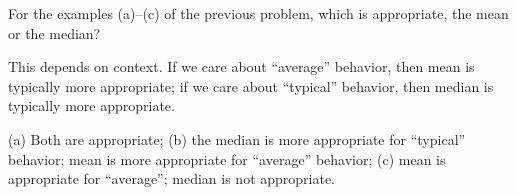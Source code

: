 \documentclass[answers,11pt]{exam}
\begin{document}
\begin{questions}
\newpage

\question For the examples (a)--(c) of the previous problem, which is
appropriate, the mean or the median?

\begin{solution}
  This depends on context. If we care about ``average'' behavior, then mean is
  typically more appropriate; if we care about ``typical'' behavior, then
  median is typically more appropriate.

(a) Both are appropriate; (b) the median is more appropriate for ``typical''
behavior; mean is more appropriate for ``average'' behavior; (c) mean is
appropriate for ``average''; median is not appropriate.
\end{solution}




\end{questions}
\end{document}
